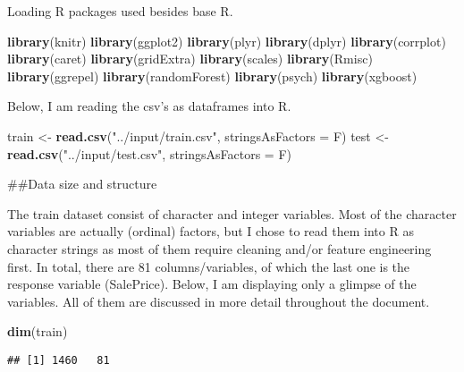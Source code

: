 \documentclass[]{article}
\newenvironment{Shaded}{\begin{snugshade}}{\end{snugshade}}
\newcommand{\DataTypeTok}[1]{\textcolor[rgb]{0.13,0.29,0.53}{#1}}
\newcommand{\KeywordTok}[1]{\textcolor[rgb]{0.13,0.29,0.53}{\textbf{#1}}}
\newcommand{\NormalTok}[1]{#1}
\newcommand{\StringTok}[1]{\textcolor[rgb]{0.31,0.60,0.02}{#1}}
\begin{document}
Loading R packages used besides base R.

\begin{Shaded}
\begin{Highlighting}[]
\KeywordTok{library}\NormalTok{(knitr)}
\KeywordTok{library}\NormalTok{(ggplot2)}
\KeywordTok{library}\NormalTok{(plyr)}
\KeywordTok{library}\NormalTok{(dplyr)}
\KeywordTok{library}\NormalTok{(corrplot)}
\KeywordTok{library}\NormalTok{(caret)}
\KeywordTok{library}\NormalTok{(gridExtra)}
\KeywordTok{library}\NormalTok{(scales)}
\KeywordTok{library}\NormalTok{(Rmisc)}
\KeywordTok{library}\NormalTok{(ggrepel)}
\KeywordTok{library}\NormalTok{(randomForest)}
\KeywordTok{library}\NormalTok{(psych)}
\KeywordTok{library}\NormalTok{(xgboost)}
\end{Highlighting}
\end{Shaded}

Below, I am reading the csv's as dataframes into R.

\begin{Shaded}
\begin{Highlighting}[]
\NormalTok{train <-}\StringTok{ }\KeywordTok{read.csv}\NormalTok{(}\StringTok{"../input/train.csv"}\NormalTok{, }\DataTypeTok{stringsAsFactors =}\NormalTok{ F)}
\NormalTok{test <-}\StringTok{ }\KeywordTok{read.csv}\NormalTok{(}\StringTok{"../input/test.csv"}\NormalTok{, }\DataTypeTok{stringsAsFactors =}\NormalTok{ F)}
\end{Highlighting}
\end{Shaded}

\#\#Data size and structure

The train dataset consist of character and integer variables. Most of
the character variables are actually (ordinal) factors, but I chose to
read them into R as character strings as most of them require cleaning
and/or feature engineering first. In total, there are 81
columns/variables, of which the last one is the response variable
(SalePrice). Below, I am displaying only a glimpse of the variables. All
of them are discussed in more detail throughout the document.

\begin{Shaded}
\begin{Highlighting}[]
\KeywordTok{dim}\NormalTok{(train)}
\end{Highlighting}
\end{Shaded}

\begin{verbatim}
## [1] 1460   81
\end{verbatim}
\end{document}
